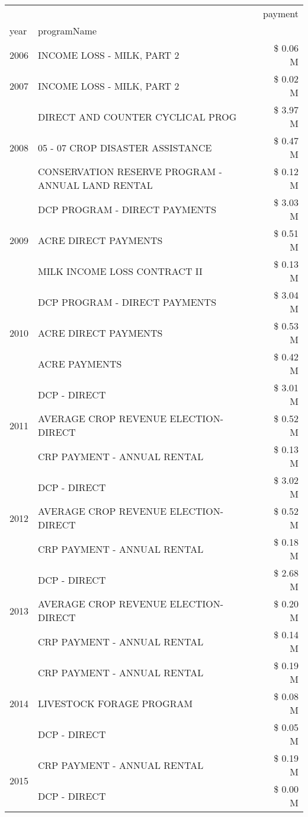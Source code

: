 \begin{tabular}{llr}
\toprule
 &  & payment \\
year & programName &  \\
\midrule
2006 & INCOME LOSS - MILK, PART 2 & \$ 0.06 M \\
\cline{1-3}
2007 & INCOME LOSS - MILK, PART 2 & \$ 0.02 M \\
\cline{1-3}
\multirow[t]{3}{*}{2008} & DIRECT AND COUNTER CYCLICAL PROG & \$ 3.97 M \\
 & 05 - 07 CROP DISASTER ASSISTANCE & \$ 0.47 M \\
 & CONSERVATION RESERVE PROGRAM - ANNUAL LAND RENTAL & \$ 0.12 M \\
\cline{1-3}
\multirow[t]{3}{*}{2009} & DCP PROGRAM - DIRECT PAYMENTS & \$ 3.03 M \\
 & ACRE DIRECT PAYMENTS & \$ 0.51 M \\
 & MILK INCOME LOSS CONTRACT II & \$ 0.13 M \\
\cline{1-3}
\multirow[t]{3}{*}{2010} & DCP PROGRAM - DIRECT PAYMENTS & \$ 3.04 M \\
 & ACRE DIRECT PAYMENTS & \$ 0.53 M \\
 & ACRE PAYMENTS & \$ 0.42 M \\
\cline{1-3}
\multirow[t]{3}{*}{2011} & DCP - DIRECT & \$ 3.01 M \\
 & AVERAGE CROP REVENUE ELECTION-DIRECT & \$ 0.52 M \\
 & CRP PAYMENT - ANNUAL RENTAL & \$ 0.13 M \\
\cline{1-3}
\multirow[t]{3}{*}{2012} & DCP - DIRECT & \$ 3.02 M \\
 & AVERAGE CROP REVENUE ELECTION-DIRECT & \$ 0.52 M \\
 & CRP PAYMENT - ANNUAL RENTAL & \$ 0.18 M \\
\cline{1-3}
\multirow[t]{3}{*}{2013} & DCP - DIRECT & \$ 2.68 M \\
 & AVERAGE CROP REVENUE ELECTION-DIRECT & \$ 0.20 M \\
 & CRP PAYMENT - ANNUAL RENTAL & \$ 0.14 M \\
\cline{1-3}
\multirow[t]{3}{*}{2014} & CRP PAYMENT - ANNUAL RENTAL & \$ 0.19 M \\
 & LIVESTOCK FORAGE PROGRAM & \$ 0.08 M \\
 & DCP - DIRECT & \$ 0.05 M \\
\cline{1-3}
\multirow[t]{3}{*}{2015} & CRP PAYMENT - ANNUAL RENTAL & \$ 0.19 M \\
 & DCP - DIRECT & \$ 0.00 M \\

\end{tabular}
